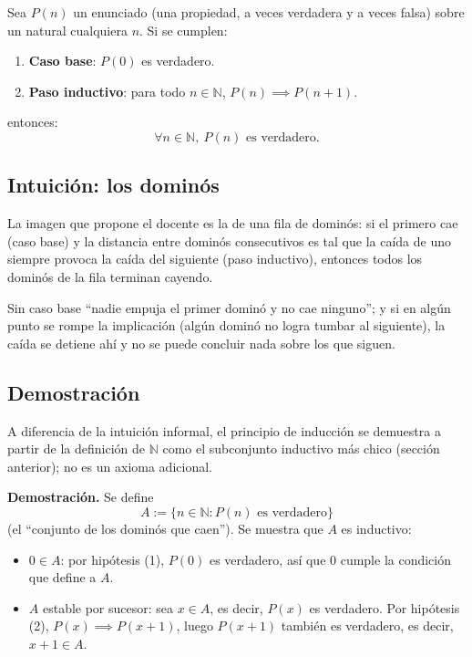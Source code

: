 \documentclass[12pt,a4paper]{article}
\begin{document}
Sea $P(n)$ un enunciado (una propiedad, a veces verdadera y a veces falsa)
sobre un natural cualquiera $n$. Si se cumplen:

\begin{enumerate}
  \item \textbf{Caso base}: $P(0)$ es verdadero.
  \item \textbf{Paso inductivo}: para todo $n \in \mathbb{N}$,
    $P(n) \implies P(n+1)$.
\end{enumerate}

entonces:
$$
\boxed{\forall n \in \mathbb{N},\ P(n) \text{ es verdadero.}}
$$

\subsection{Intuición: los dominós}

La imagen que propone el docente es la de una fila de dominós: si el
primero cae (caso base) y la distancia entre dominós consecutivos es tal
que la caída de uno siempre provoca la caída del siguiente (paso
inductivo), entonces todos los dominós de la fila terminan cayendo.

\begin{notebox}
Sin caso base ``nadie empuja el primer dominó y no cae ninguno''; y si en
algún punto se rompe la implicación (algún dominó no logra tumbar al
siguiente), la caída se detiene ahí y no se puede concluir nada sobre los
que siguen.
\end{notebox}

\subsection{Demostración}

A diferencia de la intuición informal, el principio de inducción se
demuestra a partir de la definición de $\mathbb{N}$ como el subconjunto
inductivo más chico (sección anterior); no es un axioma adicional.

\textbf{Demostración.} Se define
$$A := \{n \in \mathbb{N} : P(n) \text{ es verdadero}\}$$
(el ``conjunto de los dominós que caen''). Se muestra que $A$ es inductivo:

\begin{itemize}
  \item $0 \in A$: por hipótesis (1), $P(0)$ es verdadero, así que $0$
    cumple la condición que define a $A$.
  \item $A$ estable por sucesor: sea $x \in A$, es decir, $P(x)$ es
    verdadero. Por hipótesis (2), $P(x) \implies P(x+1)$, luego $P(x+1)$
    también es verdadero, es decir, $x + 1 \in A$.
\end{itemize}
\end{document}
